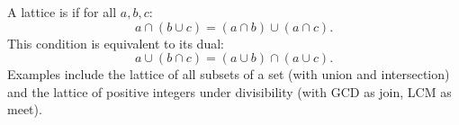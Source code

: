 A lattice is  if for all $a, b, c$:
$$a \cap (b \cup c) = (a \cap b) \cup (a \cap c).$$
This condition is equivalent to its dual:
$$a \cup (b \cap c) = (a \cup b) \cap (a \cup c).$$
Examples include the lattice of all subsets of a set (with union and intersection) and the lattice of positive integers under divisibility (with GCD as join, LCM as meet).
